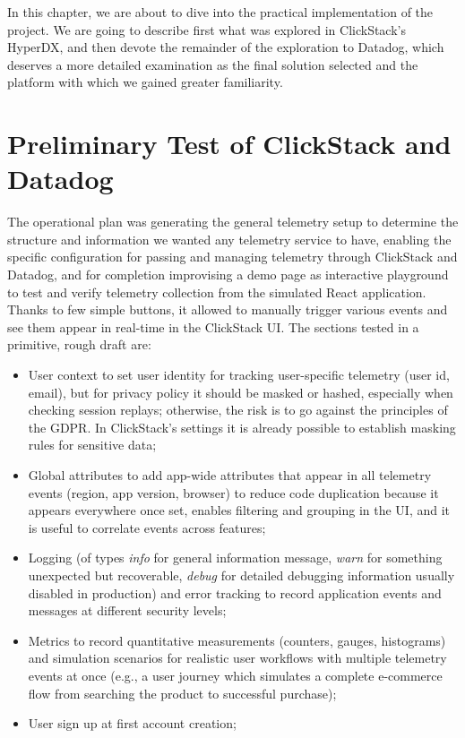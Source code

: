 \documentclass[12pt,a4paper,openright,twoside]{book}
\begin{document}
In this chapter, we are about to dive into the practical implementation of the project. We are going to describe first what was explored in ClickStack's HyperDX, and then devote the remainder of the exploration to Datadog, which deserves a more detailed examination as the final solution selected and the platform with which we gained greater familiarity.

\section{Preliminary Test of ClickStack and Datadog}

The operational plan was generating the general telemetry setup to determine the structure and information we wanted any telemetry service to have, enabling the specific configuration for passing and managing telemetry through ClickStack and Datadog, and for completion improvising a demo page as interactive playground to test and verify telemetry collection from the simulated React application. Thanks to few simple buttons, it allowed to manually trigger various events and see them appear in real-time in the ClickStack UI.
The sections tested in a primitive, rough draft are:
\begin{itemize}[nosep]
    \item User context to set user identity for tracking user-specific telemetry (user id, email), but for privacy policy it should be masked or hashed, especially when checking session replays; otherwise, the risk is to go against the principles of the GDPR. In ClickStack's settings it is already possible to establish masking rules for sensitive data; 
    \item Global attributes to add app-wide attributes that appear in all telemetry events (region, app version, browser) to reduce code duplication because it appears everywhere once set, enables filtering and grouping in the UI, and it is useful to correlate events across features;
    \item Logging (of types \textit{info} for general information message, \textit{warn} for something unexpected but recoverable, \textit{debug} for detailed debugging information usually disabled in production) and error tracking to record application events and messages at different security levels;
    \item Metrics to record quantitative measurements (counters, gauges, histograms) and simulation scenarios for realistic user workflows with multiple telemetry events at once (e.g., a user journey which simulates a complete e-commerce flow from searching the product to successful purchase); 
    \item User sign up at first account creation; 
\end{itemize}
\end{document}
